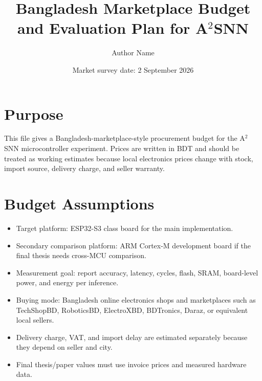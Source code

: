 \documentclass[11pt]{article}
\title{Bangladesh Marketplace Budget and Evaluation Plan for A$^2$SNN}
\author{Author Name}
\date{Market survey date: 2 September 2026}
\begin{document}
\maketitle

\section*{Purpose}
This file gives a Bangladesh-marketplace-style procurement budget for the A$^2$SNN microcontroller experiment. Prices are written in BDT and should be treated as working estimates because local electronics prices change with stock, import source, delivery charge, and seller warranty.

\section*{Budget Assumptions}
\begin{itemize}
    \item Target platform: ESP32-S3 class board for the main implementation.
    \item Secondary comparison platform: ARM Cortex-M development board if the final thesis needs cross-MCU comparison.
    \item Measurement goal: report accuracy, latency, cycles, flash, SRAM, board-level power, and energy per inference.
    \item Buying mode: Bangladesh online electronics shops and marketplaces such as TechShopBD, RoboticsBD, ElectroXBD, BDTronics, Daraz, or equivalent local sellers.
    \item Delivery charge, VAT, and import delay are estimated separately because they depend on seller and city.
    \item Final thesis/paper values must use invoice prices and measured hardware data.
\end{itemize}
\end{document}
